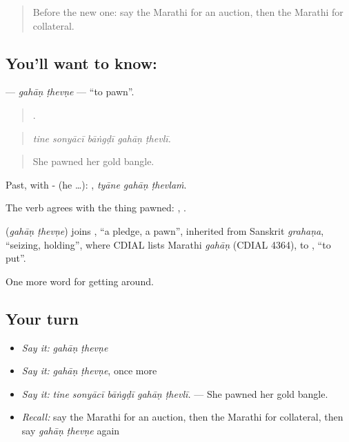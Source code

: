 \label{lesson:MR-C429-gahan-thevne}



\begin{quote}
Before the new one: say the Marathi for an auction, then the Marathi for collateral.
\end{quote}

\subsection*{You'll want to know:  }
\textbf{ } — \emph{gahāṇ ṭhevṇe} — \textquotedblleft{}to pawn\textquotedblright{}.

\begin{quote}
    .
\end{quote}

\begin{quote}
\emph{tine sonyācī bāṅgḍī gahāṇ ṭhevlī.}
\end{quote}

\begin{quote}
She pawned her gold bangle.
\end{quote}

Past, with - (he …):   , \emph{tyāne gahāṇ ṭhevlaṁ}.

The verb agrees with the thing pawned:  ,  .

\begin{cousinweb}
\textbf{ } (\emph{gahāṇ ṭhevṇe}) joins \textbf{}, \textquotedblleft{}a pledge, a pawn\textquotedblright{}, inherited from Sanskrit \emph{grahaṇa}, \textquotedblleft{}seizing, holding\textquotedblright{}, where CDIAL lists Marathi \emph{gahāṇ} (CDIAL 4364), to \textbf{}, \textquotedblleft{}to put\textquotedblright{}.
\end{cousinweb}

\begin{grammarlens}[title={What you've built}]
One more word for getting around.
\end{grammarlens}

\subsection*{Your turn}
\begin{itemize}
\raggedright
  \item \emph{Say it:} \emph{gahāṇ ṭhevṇe}
  \item \emph{Say it:} \emph{gahāṇ ṭhevṇe}, once more
  \item \emph{Say it:} \emph{tine sonyācī bāṅgḍī gahāṇ ṭhevlī.} — She pawned her gold bangle.
  \item \emph{Recall:} say the Marathi for an auction, then the Marathi for collateral, then say \emph{gahāṇ ṭhevṇe} again
\end{itemize}

